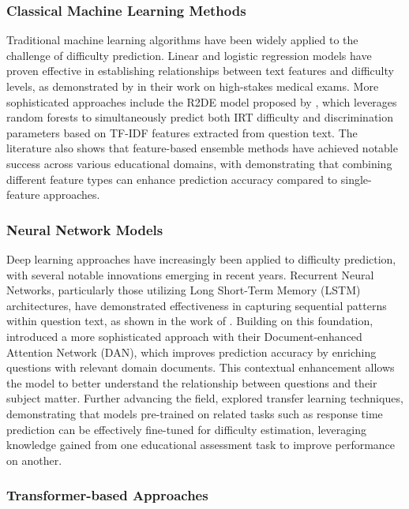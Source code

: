 \documentclass[
    a4paper, %
    10pt, %
    twoside, %
]{LTJournalArticle}
\begin{document}
\subsubsection{Classical Machine Learning Methods}

Traditional machine learning algorithms have been widely applied to the challenge of difficulty prediction. Linear and logistic regression models have proven effective in establishing relationships between text features and difficulty levels, as demonstrated by \textcite{yaneva2019predicting} in their work on high-stakes medical exams. More sophisticated approaches include the R2DE model proposed by \textcite{benedetto2020r2de}, which leverages random forests to simultaneously predict both IRT difficulty and discrimination parameters based on TF-IDF features extracted from question text. The literature also shows that feature-based ensemble methods have achieved notable success across various educational domains, with \textcite{yaneva2019predicting} demonstrating that combining different feature types can enhance prediction accuracy compared to single-feature approaches.

\subsubsection{Neural Network Models}

Deep learning approaches have increasingly been applied to difficulty prediction, with several notable innovations emerging in recent years. Recurrent Neural Networks, particularly those utilizing Long Short-Term Memory (LSTM) architectures, have demonstrated effectiveness in capturing sequential patterns within question text, as shown in the work of \textcite{huang2017question}. Building on this foundation, \textcite{qiu2019question} introduced a more sophisticated approach with their Document-enhanced Attention Network (DAN), which improves prediction accuracy by enriching questions with relevant domain documents. This contextual enhancement allows the model to better understand the relationship between questions and their subject matter. Further advancing the field, \textcite{xue2020predicting} explored transfer learning techniques, demonstrating that models pre-trained on related tasks such as response time prediction can be effectively fine-tuned for difficulty estimation, leveraging knowledge gained from one educational assessment task to improve performance on another.

\subsubsection{Transformer-based Approaches}
\end{document}
